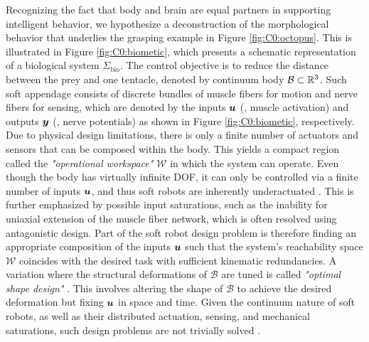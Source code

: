 Recognizing the fact that body and brain are equal partners in supporting intelligent behavior, we hypothesize a deconstruction of the morphological behavior that underlies the grasping example in Figure \ref{fig:C0:octopus}. This is illustrated in Figure \ref{fig:C0:biometic}, which presents a schematic representation of a biological system $\Sigma_{\textrm{bio}}$. The control objective is to reduce the distance between the prey and one tentacle, denoted by continuum body $\mathcal{B} \subset \mathbb{R}^3$. Such soft appendage consists of discrete bundles of muscle fibers for motion and nerve fibers for sensing, which are denoted by the inputs ${\boldsymbol{u}}$ (\eg, muscle activation) and outputs ${\boldsymbol{y}}$ (\eg, nerve potentials) as shown in Figure \ref{fig:C0:biometic}, respectively. Due to physical design limitations, there is only a finite number of actuators and sensors that can be composed within the body. This yields a compact region called the \textit{"operational workspace"} $\mathcal{W}$ \cite{Spong1996,Murray1994,Ortega1998} in which the system can operate. Even though the body has virtually infinite DOF, it can only be controlled via a finite number of inputs ${\boldsymbol{u}}$, and thus soft robots are inherently underactuated \cite{Spong1996,Russ2022}. This is further emphasized by possible input saturations, such as the inability for uniaxial extension of the muscle fiber network, which is often resolved using antagonistic design. Part of the soft robot design problem is therefore finding an appropriate composition of the inputs ${\boldsymbol{u}}$ such that the system's reachability space $\mathcal{W}$ coincides with the desired task with sufficient kinematic redundancies. A variation where the structural deformations of $\mathcal{B}$ are tuned is called \textit{"optimal shape design"} \cite{Bendsoe2003}. This involves altering the shape of $\mathcal{B}$ to achieve the desired deformation but fixing ${\boldsymbol{u}}$ in space and time. Given the continuum nature of soft robots, as well as their distributed actuation, sensing, and mechanical saturations, such design problems are not trivially solved \cite{Xavier2022Jun,Bern2019,Coevoet2017Feb,Tian2020May,Smith2022}.

